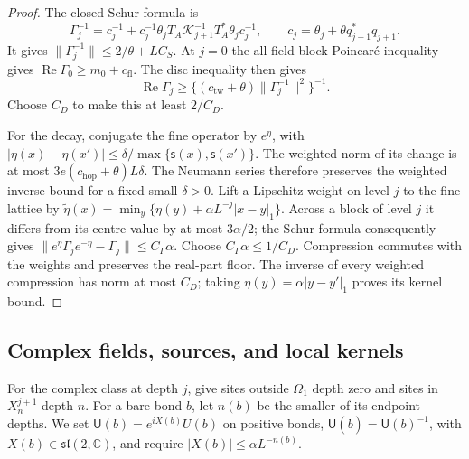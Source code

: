 \documentclass[11pt,letterpaper,reqno]{amsart}
\theoremstyle{definition}
\theoremstyle{remark}
\begin{document}
\begin{proof}
The closed Schur formula is
\[
 \Gamma_j^{-1}=c_j^{-1}+c_j^{-1}\theta_jT_A
               \mathcal K_{j+1}^{-1}T_A^*\theta_jc_j^{-1},
 \qquad c_j=\theta_j+\theta q_{j+1}^*q_{j+1}.
\]
It gives $\|\Gamma_j^{-1}\|\le2/\theta+LC_S$.
At $j=0$ the all-field block Poincar\'e inequality gives
$\operatorname{Re}\Gamma_0\ge m_0+c_{\mathrm{fl}}$.
The disc inequality then gives
\[
 \operatorname{Re}\Gamma_j\ge
 \{(c_{\mathrm{tw}}+\theta)\|\Gamma_j^{-1}\|^2\}^{-1}.
\]
Choose $C_D$ to make this at least $2/C_D$.

For the decay, conjugate the fine operator by $e^\eta$, with
$|\eta(x)-\eta(x')|\le\delta/\max\{\mathsf s(x),\mathsf s(x')\}$.
The weighted norm of its change is at most
$3e(c_{\mathrm{hop}}+\theta)L\delta$.
The Neumann series therefore preserves the weighted inverse bound
for a fixed small $\delta>0$.  Lift a Lipschitz weight on level
$j$ to the fine lattice by
$\tilde\eta(x)=\min_y\{\eta(y)+\alpha L^{-j}|x-y|_1\}$.
Across a block of level $j$ it differs from its centre value by
at most $3\alpha/2$; the Schur formula consequently gives
$\|e^\eta\Gamma_je^{-\eta}-\Gamma_j\|\le C_\Gamma\alpha$.
Choose $C_\Gamma\alpha\le1/C_D$.
Compression commutes with the weights and preserves the real-part
floor.  The inverse of every weighted compression has norm at most
$C_D$; taking $\eta(y)=\alpha|y-y'|_1$ proves its kernel bound.
\end{proof}

\subsection{Complex fields, sources, and local kernels}

For the complex class at depth $j$, give sites outside $\Omega_1$
depth zero and sites in $X_n^{j+1}$ depth $n$.
For a bare bond $b$, let $n(b)$ be the smaller of its endpoint
depths. We set $\mathsf U(b)=e^{iX(b)}U(b)$ on positive bonds,
$\mathsf U(\bar b)=\mathsf U(b)^{-1}$, with
$X(b)\in\mathfrak{sl}(2,\mathbb C)$, and require
$|X(b)|\le\alpha L^{-n(b)}$.
\end{document}
